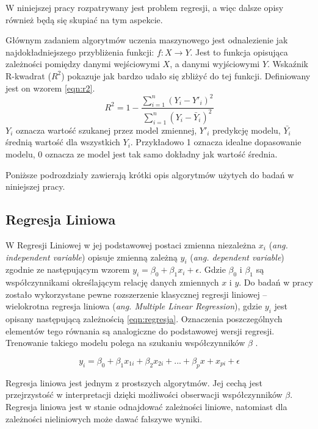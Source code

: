 W niniejszej  pracy rozpatrywany  jest problem regresji, a więc dalsze opisy również będą się skupiać na tym aspekcie. \par

Głównym zadaniem algorytmów uczenia maszynowego jest odnalezienie jak najdokładniejszego przybliżenia funkcji: $f \colon X \to Y$. Jest to funkcja opisująca zależności pomiędzy danymi wejściowymi $X$, a danymi wyjściowymi $Y$\cite{ml_supervised}. Wskaźnik R-kwadrat ($R^2$) pokazuje jak bardzo udało się zbliżyć do tej funkcji. Definiowany jest on wzorem \ref{eqn:r2}. 
\begin{equation}
\label{eqn:r2}
R^2=1- \frac{ \sum_{i=1}^{n}(Y_i-Y'_i)^2}{\sum_{i=1}^{n}(Y_i-\bar{Y}_i)^2 }
\end{equation}
$Y_i$ oznacza wartość szukanej przez model zmiennej, $Y'_i$ predykcję modelu, $\bar{Y_i}$ średnią wartość dla wszystkich $Y_i$. Przykładowo 1 oznacza idealne dopasowanie modelu, 0 oznacza ze model jest tak samo dokładny jak wartość średnia.\par
Poniższe podrozdziały zawierają krótki opis algorytmów użytych do badań w niniejszej pracy.


\subsection{Regresja Liniowa}
W Regresji Liniowej w jej podstawowej postaci zmienna niezależna $x_i$ ({\em ang. independent variable}) opisuje zmienną zależną $y_i$ ({\em ang. dependent variable}) zgodnie ze następującym wzorem $y_i = \beta_0 + \beta_1 x_i + \epsilon$. Gdzie $\beta_0$ i $\beta_1$ są współczynnikami określającym relację danych zmiennych $x$ i $y$. Do badań w pracy zostało wykorzystane pewne rozszerzenie klasycznej regresji liniowej -- wielokrotna regresja liniowa ({\em ang. Multiple Linear Regression}), gdzie $y_i$ jest opisany następującą zależnością \ref{eqn:regresja}. Oznaczenia poszczególnych elementów tego równania są analogiczne do podstawowej wersji regresji. Trenowanie takiego modelu polega na szukaniu współczynników $\beta$ \cite{mlr} .\par

\begin{equation}
\label{eqn:regresja}
y_i = \beta_0 + \beta_1 x_{1i} + \beta_2 x_{2i} + ... + \beta_p x+x_{pi} + \epsilon
\end{equation}

Regresja liniowa jest jednym z prostszych algorytmów. Jej cechą jest przejrzystość w interpretacji  dzięki możliwości obserwacji współczynników $\beta$. Regresja liniowa jest w stanie odnajdować zależności liniowe, natomiast dla zależności nieliniowych może dawać fałszywe wyniki.


